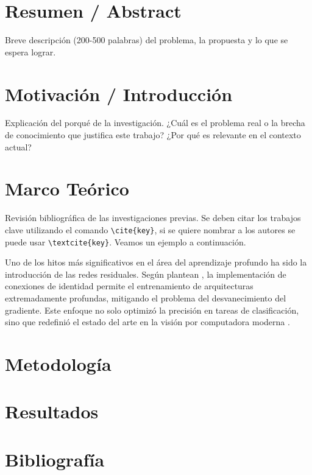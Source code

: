 \documentclass[12pt,a4paper]{article}
\begin{document}
\newpage
\tableofcontents
\newpage


\section*{Resumen / Abstract}
Breve descripción (200-500 palabras) del problema, la propuesta y lo que se espera lograr.

\section{Motivación / Introducción}
Explicación del porqué de la investigación. ¿Cuál es el problema real o la brecha de conocimiento que justifica este trabajo? ¿Por qué es relevante en el contexto actual?

\section{Marco Teórico}
Revisión bibliográfica de las investigaciones previas. Se deben citar los trabajos clave utilizando el comando \texttt{\textbackslash cite\{key\}}, si se quiere nombrar a los autores se puede usar \texttt{\textbackslash textcite\{key\}}. Veamos un ejemplo a continuación.

Uno de los hitos más significativos en el área del aprendizaje profundo ha sido la introducción de las redes residuales. Según plantean \textcite{he2016deep}, la implementación de conexiones de identidad permite el entrenamiento de arquitecturas extremadamente profundas, mitigando el problema del desvanecimiento del gradiente. Este enfoque no solo optimizó la precisión en tareas de clasificación, sino que redefinió el estado del arte en la visión por computadora moderna \cite{he2016deep}.

\section{Metodología}


\section{Resultados}


\section{Bibliografía}
\printbibliography[heading=none]
\end{document}
